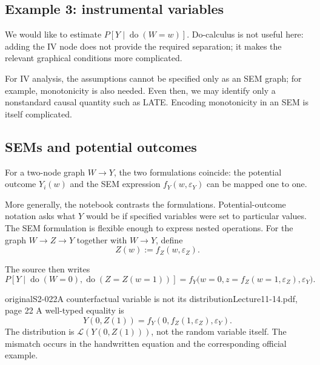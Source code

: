\subsection{Example 3: instrumental variables}
\begin{center}
\end{center}
We would like to estimate $P[Y\mid\operatorname{do}(W=w)]$. Do-calculus is not useful here: adding the IV node does not provide the required separation; it makes the relevant graphical conditions more complicated.

For IV analysis, the assumptions cannot be specified only as an SEM graph; for example, monotonicity is also needed. Even then, we may identify only a nonstandard causal quantity such as LATE. Encoding monotonicity in an SEM is itself complicated.

\subsection{SEMs and potential outcomes}
For a two-node graph $W\to Y$, the two formulations coincide: the potential outcome $Y_i(w)$ and the SEM expression $f_Y(w,\varepsilon_Y)$ can be mapped one to one.

More generally, the notebook contrasts the formulations. Potential-outcome notation asks what $Y$ would be if specified variables were set to particular values. The SEM formulation is flexible enough to express nested operations. For the graph $W\to Z\to Y$ together with $W\to Y$, define
\[
 Z(w):=f_Z(w,\varepsilon_Z).
\]
\begin{center}
\end{center}
The source then writes
\[
 P[Y\mid\operatorname{do}(W=0),\operatorname{do}(Z=Z(w=1))]
 =f_Y\bigl(w=0,z=f_Z(w=1,\varepsilon_Z),\varepsilon_Y\bigr).
\]
\begin{reviewnote}{original}{S2-022}{A counterfactual variable is not its distribution}{Lecture11-14.pdf, page 22}
A well-typed equality is
\[
 Y(0,Z(1))=f_Y(0,f_Z(1,\varepsilon_Z),\varepsilon_Y).
\]
The distribution is $\mathcal L(Y(0,Z(1)))$, not the random variable itself. The mismatch occurs in the handwritten equation and the corresponding official example.
\end{reviewnote}


